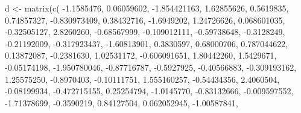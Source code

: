 \documentclass[
  12pt,
]{krantz}
\makeatletter
\newenvironment{Shaded}{\begin{snugshade}}{\end{snugshade}}
\newcommand{\FloatTok}[1]{\textcolor[rgb]{0.06,0.06,0.06}{#1}}
\newcommand{\FunctionTok}[1]{\textcolor[rgb]{0,0,0}{#1}}
\newcommand{\NormalTok}[1]{#1}
\newcommand{\OtherTok}[1]{\textcolor[rgb]{0.37,0.37,0.37}{#1}}
\newcommand{\SpecialCharTok}[1]{\textcolor[rgb]{0,0,0}{#1}}
\newenvironment{kframe}{%
\medskip{}
\setlength{\fboxsep}{.8em}
 \def\at@end@of@kframe{}%
 \ifinner\ifhmode%
  \def\at@end@of@kframe{\end{minipage}}%
  \begin{minipage}{\columnwidth}%
 \fi\fi%
 \def\FrameCommand##1{\hskip\@totalleftmargin \hskip-\fboxsep
 \colorbox{shadecolor}{##1}\hskip-\fboxsep
     \hskip-\linewidth \hskip-\@totalleftmargin \hskip\columnwidth}%
 \MakeFramed {\advance\hsize-\width
   \@totalleftmargin\z@ \linewidth\hsize
   \@setminipage}}%
 {\par\unskip\endMakeFramed%
 \at@end@of@kframe}
\renewenvironment{Shaded}{\begin{kframe}}{\end{kframe}}
\makeatother
\begin{document}
\begin{Shaded}
\begin{Highlighting}[]
\NormalTok{d }\OtherTok{\textless{}{-}} \FunctionTok{matrix}\NormalTok{(}\FunctionTok{c}\NormalTok{(}
  \SpecialCharTok{{-}}\FloatTok{1.1585476}\NormalTok{,  }\FloatTok{0.06059602}\NormalTok{, }\SpecialCharTok{{-}}\FloatTok{1.854421163}\NormalTok{,  }\FloatTok{1.62855626}\NormalTok{,}
  \FloatTok{0.5619835}\NormalTok{,  }\FloatTok{0.74857327}\NormalTok{, }\SpecialCharTok{{-}}\FloatTok{0.830973409}\NormalTok{,  }\FloatTok{0.38432716}\NormalTok{,}
  \SpecialCharTok{{-}}\FloatTok{1.6949202}\NormalTok{,  }\FloatTok{1.24726626}\NormalTok{,  }\FloatTok{0.068601035}\NormalTok{, }\SpecialCharTok{{-}}\FloatTok{0.32505127}\NormalTok{,}
  \FloatTok{2.8260260}\NormalTok{, }\SpecialCharTok{{-}}\FloatTok{0.68567999}\NormalTok{, }\SpecialCharTok{{-}}\FloatTok{0.109012111}\NormalTok{, }\SpecialCharTok{{-}}\FloatTok{0.59738648}\NormalTok{,}
  \SpecialCharTok{{-}}\FloatTok{0.3128249}\NormalTok{, }\SpecialCharTok{{-}}\FloatTok{0.21192009}\NormalTok{, }\SpecialCharTok{{-}}\FloatTok{0.317923437}\NormalTok{, }\SpecialCharTok{{-}}\FloatTok{1.60813901}\NormalTok{,}
  \FloatTok{0.3830597}\NormalTok{,  }\FloatTok{0.68000706}\NormalTok{,  }\FloatTok{0.787044622}\NormalTok{,  }\FloatTok{0.13872087}\NormalTok{,}
  \SpecialCharTok{{-}}\FloatTok{0.2381630}\NormalTok{,  }\FloatTok{1.02531172}\NormalTok{, }\SpecialCharTok{{-}}\FloatTok{0.606091651}\NormalTok{,  }\FloatTok{1.80442260}\NormalTok{,}
  \FloatTok{1.5429671}\NormalTok{, }\SpecialCharTok{{-}}\FloatTok{0.05174198}\NormalTok{, }\SpecialCharTok{{-}}\FloatTok{1.950780046}\NormalTok{, }\SpecialCharTok{{-}}\FloatTok{0.87716787}\NormalTok{,}
  \SpecialCharTok{{-}}\FloatTok{0.5927925}\NormalTok{, }\SpecialCharTok{{-}}\FloatTok{0.40566883}\NormalTok{, }\SpecialCharTok{{-}}\FloatTok{0.309193162}\NormalTok{,  }\FloatTok{1.25575250}\NormalTok{,}
  \SpecialCharTok{{-}}\FloatTok{0.8970403}\NormalTok{, }\SpecialCharTok{{-}}\FloatTok{0.10111751}\NormalTok{,  }\FloatTok{1.555160257}\NormalTok{, }\SpecialCharTok{{-}}\FloatTok{0.54434356}\NormalTok{,}
  \FloatTok{2.4060504}\NormalTok{, }\SpecialCharTok{{-}}\FloatTok{0.08199934}\NormalTok{, }\SpecialCharTok{{-}}\FloatTok{0.472715155}\NormalTok{,  }\FloatTok{0.25254794}\NormalTok{,}
  \SpecialCharTok{{-}}\FloatTok{1.0145770}\NormalTok{, }\SpecialCharTok{{-}}\FloatTok{0.83132666}\NormalTok{, }\SpecialCharTok{{-}}\FloatTok{0.009597552}\NormalTok{, }\SpecialCharTok{{-}}\FloatTok{1.71378699}\NormalTok{,}
  \SpecialCharTok{{-}}\FloatTok{0.3590219}\NormalTok{,  }\FloatTok{0.84127504}\NormalTok{,  }\FloatTok{0.062052945}\NormalTok{, }\SpecialCharTok{{-}}\FloatTok{1.00587841}\NormalTok{,}

\end{Highlighting}
\end{Shaded}
\end{document}

